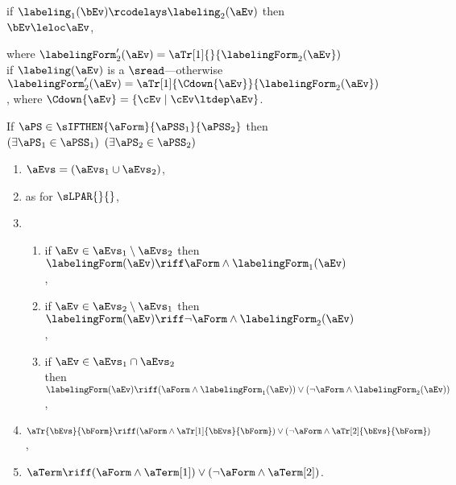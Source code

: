 \begin{figure}
\begin{multicols}{2}
\begin{enumerate}[topsep=0pt,label=(\textsc{s}\arabic*),ref=\textsc{s}\arabic*]
\begin{enumerate}[leftmargin=0pt]
        if $\labeling_1(\bEv)\rcodelays\labeling_2(\aEv)$
        then $\bEv\leloc\aEv$,
      \end{enumerate}
    \end{enumerate}
  \end{multicols}
  where
  $\labelingForm'_2(\aEv)=\aTr[1]{}{\labelingForm_2(\aEv})$ if $\labeling(\aEv)$ is a $\sread$---otherwise
  $\labelingForm'_2(\aEv)=\aTr[1]{\Cdown{\aEv}}{\labelingForm_2(\aEv})$, where
  $\Cdown{\aEv}=\{ \cEv \mid \cEv \ltdep \aEv \}$.
  \medskip

  \noindent
  If $\aPS \in \sIFTHEN{\aForm}{\aPSS_1}{\aPSS_2}$ then
  $(\exists\aPS_1\in\aPSS_1)$ $(\exists\aPS_2\in\aPSS_2)$
  \begin{multicols}{2}
    \begin{enumerate}[topsep=0pt,label=(\textsc{i}\arabic*),ref=\textsc{i}\arabic*]
    \item \label{if-E}
      $\aEvs = (\aEvs_1\cup\aEvs_2)$,
    \item \label{if-lambda}
       as for $\sLPAR{}{}$,
    \item[] \setcounter{enumi}{\value{kappa}} 
      \begin{enumerate}[leftmargin=0pt]
      \item \label{if-kappa1}
        if $\aEv\in\aEvs_1\setminus\aEvs_2$ then $\labelingForm(\aEv) \riff \aForm\land\labelingForm_1(\aEv)$,
      \item \label{if-kappa2}
        if $\aEv\in\aEvs_2\setminus\aEvs_1$ then $\labelingForm(\aEv) \riff \neg\aForm\land\labelingForm_2(\aEv)$, 
      \item \label{if-kappa12}
        if $\aEv\in\aEvs_1\cap\aEvs_2$\\ then
        $\labelingForm(\aEv) \riff (\aForm\land\labelingForm_1(\aEv))\lor(\neg\aForm\land\labelingForm_2(\aEv))$,
      \end{enumerate}
    \item \label{if-tau}
      $\aTr{\bEvs}{\bForm} \riff (\aForm\land\aTr[1]{\bEvs}{\bForm})\lor(\neg\aForm\land\aTr[2]{\bEvs}{\bForm})$,
    \item \label{if-term}
      $\aTerm \riff (\aForm\land\aTerm[1])\lor(\neg\aForm\land\aTerm[2])$.
    \end{enumerate}
  \end{multicols}
  \medskip


\end{figure}
